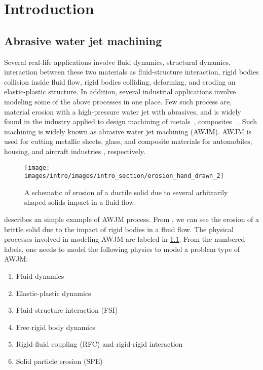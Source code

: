 \chapter{Introduction}
\label{chap:SPH}
\section{Abrasive water jet machining}
Several real-life applications involve fluid dynamics, structural dynamics,
interaction between these two materials as fluid-structure interaction, rigid
bodies collision inside fluid flow, rigid bodies colliding, deforming, and
eroding an elastic-plastic structure. In addition, several industrial
applications involve modeling some of the above processes in one place. Few such
process are, material erosion with a high-pressure water jet with abrasives, and
is widely found in the industry applied to design machining of
metals~\citep{llanto_recent_2021}, composites~ \cite{alberdi_composite_2013}.
Such machining is widely known as abrasive water jet machining (AWJM). AWJM is
used for cutting metallic sheets, glass, and composite materials for
automobiles, housing, and aircraft industries
\citep{alberdi_composite_2013,aich_abrasive_2014,llanto_recent_2021},
respectively.
\begin{figure}
  \centering
  \texttt{[image: images/intro/images/intro\_section/erosion\_hand\_drawn\_2]}
  \caption{A schematic of erosion of a ductile solid due to several arbitrarily
    shaped solids impact in a fluid flow.}
\label{fig:intro-big-picture}
\end{figure}
 describes an simple example of AWJM process. From
, we can see the erosion of a brittle solid due to
the impact of rigid bodies in a fluid flow. The physical processes involved in
modeling AWJM are labeled in \cref{fig:intro-big-picture}. From the numbered
labels, one needs to model the following physics to model a problem type of
AWJM:
\begin{enumerate}
\item Fluid dynamics
\item Elastic-plastic dynamics
\item Fluid-structure interaction (FSI)
\item Free rigid body dynamics
\item Rigid-fluid coupling (RFC) and rigid-rigid interaction
\item Solid particle erosion (SPE)
\end{enumerate}
